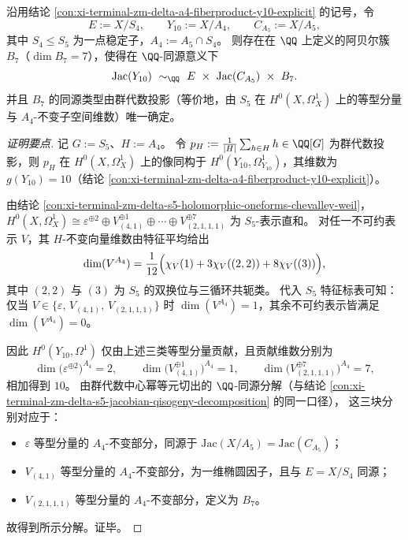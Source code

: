 \begin{conclusion}[\texorpdfstring{$Y_{10}=X/A_4$}{Y10} 的 Jacobian 的 \texorpdfstring{$1+2+7$}{1+2+7} 维同源分解]\label{con:xi-terminal-zm-delta-y10-jacobian-qisogeny-1-2-7}
沿用结论 \ref{con:xi-terminal-zm-delta-a4-fiberproduct-y10-explicit} 的记号，令
\[
E:=X/S_4,\qquad
Y_{10}:=X/A_4,\qquad
C_{A_5}:=X/A_5,
\]
其中 \(S_4\le S_5\) 为一点稳定子，\(A_4:=A_5\cap S_4\)。
则存在在 \(\QQ\) 上定义的阿贝尔簇 \(B_7\)（\(\dim B_7=7\)），使得在 \(\QQ\)-同源意义下
\[
\mathrm{Jac}(Y_{10})\ \sim_{\QQ}\ E\ \times\ \mathrm{Jac}(C_{A_5})\ \times\ B_7.
\]
并且 \(B_7\) 的同源类型由群代数投影（等价地，由 \(S_5\) 在 \(H^0(X,\Omega_X^1)\) 上的等型分量与 \(A_4\)-不变子空间维数）唯一确定。
\end{conclusion}
\begin{proof}[证明要点]
记 \(G:=S_5\)、\(H:=A_4\)。
令
\(
p_H:=\frac{1}{|H|}\sum_{h\in H}h\in \QQ[G]
\)
为群代数投影，则 \(p_H\) 在 \(H^0(X,\Omega_X^1)\) 上的像同构于 \(H^0(Y_{10},\Omega_{Y_{10}}^1)\)，其维数为 \(g(Y_{10})=10\)（结论 \ref{con:xi-terminal-zm-delta-a4-fiberproduct-y10-explicit}）。
\par
由结论 \ref{con:xi-terminal-zm-delta-s5-holomorphic-oneforms-chevalley-weil}，
\(
H^0(X,\Omega_X^1)\cong
\varepsilon^{\oplus 2}\oplus V_{(4,1)}^{\oplus 1}\oplus\cdots\oplus V_{(2,1,1,1)}^{\oplus 7}
\)
为 \(S_5\)-表示直和。
对任一不可约表示 \(V\)，其 \(H\)-不变向量维数由特征平均给出
\[
\dim(V^{A_4})=\frac1{12}\Bigl(\chi_V(1)+3\chi_V((2,2))+8\chi_V((3))\Bigr),
\]
其中 \((2,2)\) 与 \((3)\) 为 \(S_5\) 的双换位与三循环共轭类。
代入 \(S_5\) 特征标表可知：仅当 \(V\in\{\varepsilon,\,V_{(4,1)},\,V_{(2,1,1,1)}\}\) 时 \(\dim(V^{A_4})=1\)，其余不可约表示皆满足 \(\dim(V^{A_4})=0\)。
\par
因此 \(H^0(Y_{10},\Omega^1)\) 仅由上述三类等型分量贡献，且贡献维数分别为
\[
\dim\bigl(\varepsilon^{\oplus 2}\bigr)^{A_4}=2,\qquad
\dim\bigl(V_{(4,1)}^{\oplus 1}\bigr)^{A_4}=1,\qquad
\dim\bigl(V_{(2,1,1,1)}^{\oplus 7}\bigr)^{A_4}=7,
\]
相加得到 \(10\)。
由群代数中心幂等元切出的 \(\QQ\)-同源分解（与结论 \ref{con:xi-terminal-zm-delta-s5-jacobian-qisogeny-decomposition} 的同一口径），
这三块分别对应于：
\begin{itemize}
  \item \(\varepsilon\) 等型分量的 \(A_4\)-不变部分，同源于 \(\mathrm{Jac}(X/A_5)=\mathrm{Jac}(C_{A_5})\)；
  \item \(V_{(4,1)}\) 等型分量的 \(A_4\)-不变部分，为一维椭圆因子，且与 \(E=X/S_4\) 同源；
  \item \(V_{(2,1,1,1)}\) 等型分量的 \(A_4\)-不变部分，定义为 \(B_7\)。
\end{itemize}
故得到所示分解。证毕。
\end{proof}

